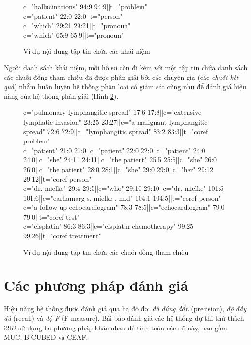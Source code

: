 \begin{figure}[ht]
\begin{mdframed}
\ttfamily\footnotesize
\protect\raggedright
c="hallucinations" 94:9 94:9||t="problem"\\
c="patient" 22:0 22:0||t="person"\\
c="which" 29:21 29:21||t="pronoun"\\
c="which" 65:9 65:9||t="pronoun"
\end{mdframed}
\caption{Ví dụ nội dung tập tin chứa các khái niệm\label{con-eg}}
\end{figure}

Ngoài danh sách khái niệm, mỗi hồ sơ còn đi kèm với một tập tin chứa danh sách các chuỗi đồng tham chiếu đã được phân giải bởi các chuyên gia (các \emph{chuỗi kết quả}) nhằm huấn luyện hệ thống phân loại có giám sát cũng như để đánh giá hiệu năng của hệ thống phân giải (Hình \ref{chains-eg}).

\begin{figure}[ht]
\begin{mdframed}
\ttfamily\footnotesize
\protect\raggedright
c="pulmonary lymphangitic spread" 17:6 17:8||c="extensive lymphatic invasion" 23:25 23:27||c="a malignant lymphangitic spread" 72:6 72:9||c="lymphangitic spread" 83:2 83:3||t="coref problem"\\
c="patient" 21:0 21:0||c="patient" 22:0 22:0||c="patient" 24:0 24:0||c="she" 24:11 24:11||c="the patient" 25:5 25:6||c="she" 26:0 26:0||c="the patient" 28:0 28:1||c="she" 29:0 29:0||c="her" 29:12 29:12||t="coref person"\\
c="dr. mielke" 29:4 29:5||c="who" 29:10 29:10||c="dr. mielke" 101:5 101:6||c="earllamarg s. mielke , m.d" 104:1 104:5||t="coref person"\\
c="a follow-up echocardiogram" 78:3 78:5||c="echocardiogram" 79:0 79:0||t="coref test"\\
c="cisplatin" 86:3 86:3||c="cisplatin chemotherapy" 99:25 99:26||t="coref treatment"
\end{mdframed}
\caption{Ví dụ nội dung tập tin chứa các chuỗi đồng tham chiếu\label{chains-eg}}
\end{figure}

\section{Các phương pháp đánh giá}
Hiệu năng hệ thống được đánh giá qua ba độ đo: \emph{độ đúng đắn} (precision), \emph{độ đầy đủ} (recall) và \emph{độ F} (F-measure). Bài báo đánh giá các hệ thống dự thi thử thách i2b2 sử dụng ba phương pháp khác nhau để tính toán các độ này, bao gồm: MUC, B-CUBED và CEAF.

